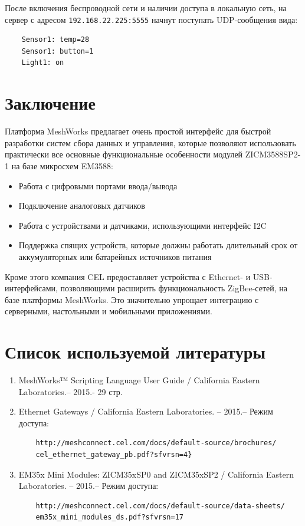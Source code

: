\documentclass[11pt]{article}
\begin{document}
После включения беспроводной сети и наличии доступа в локальную сеть, на сервер с адресом
\texttt{192.168.22.225:5555} начнут поступать UDP-сообщения вида:
\begin{verbatim}
    Sensor1: temp=28
    Sensor1: button=1
    Light1: on
\end{verbatim}
\newpage %
\section*{Заключение}
Платформа MeshWorks предлагает очень простой интерфейс для быстрой разработки систем
сбора данных и управления, которые позволяют использовать практически все основные функциональные
особенности модулей ZICM3588SP2-1 на базе микросхем EM3588:
\begin{itemize}
 \item Работа с цифровыми портами ввода/вывода
 \item Подключение аналоговых датчиков
 \item Работа с устройствами и датчиками, использующими интерфейс I2C
 \item Поддержка спящих устройств, которые должны работать длительный срок от
 аккумуляторных или батарейных источников питания
\end{itemize}
Кроме этого компания CEL предоставляет устройства с Ethernet- и USB-интерфейсами, 
позволяющими расширить функциональность ZigBee-сетей, на базе платформы MeshWorks.
Это значительно упрощает интеграцию с серверными, настольными и мобильными приложениями.

\section*{Список используемой литературы}

\begin{enumerate}
    \item MeshWorks™ Scripting Language User Guide / California Eastern Laboratories.--
    2015.- 29 стр.
    \item Ethernet Gateways / California Eastern Laboratories. -- 2015.– Режим доступа:
    \begin{verbatim}
    http://meshconnect.cel.com/docs/default-source/brochures/
    cel_ethernet_gateway_pb.pdf?sfvrsn=4}
    \end{verbatim}
    \item EM35x Mini Modules: ZICM35xSP0 and ZICM35xSP2 / California Eastern Laboratories. -- 2015.– Режим доступа:
    \begin{verbatim}
    http://meshconnect.cel.com/docs/default-source/data-sheets/
    em35x_mini_modules_ds.pdf?sfvrsn=17
    \end{verbatim}
\end{enumerate}
\end{document}
